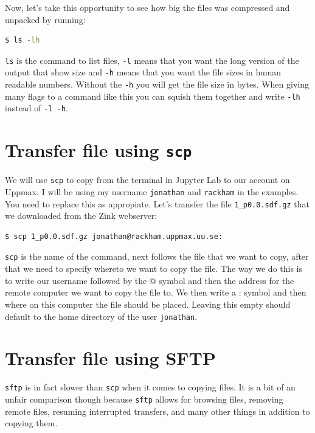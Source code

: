 \documentclass[watermark]{pbpreprint}
\begin{document}
\vspace{1\baselineskip}
Now, let's take this opportunity to see how big the files was compressed and
unpacked by running: 
\begin{lstlisting}[language=bash]
$ ls -lh
\end{lstlisting}
\texttt{ls} is the command to list files, \texttt{-l} means that you want the
long version of the output that show size and \texttt{-h} means that you want
the file sizes in human readable numbers. Without the \texttt{-h} you will get
the file size in bytes. When giving many flags to a command like this you can
squish them together and write \texttt{-lh} instead of \texttt{-l -h}.

\section{Transfer file using \texttt{scp}}
 We will use \texttt{scp} to copy from the terminal
in Jupyter Lab to our account on Uppmax. I will be using my username
\texttt{jonathan} and \texttt{rackham} in the examples. You need to replace
this as appropiate. Let's transfer the file \texttt{1\_p0.0.sdf.gz} that we
downloaded from the Zink webserver:
%
\begin{lstlisting}[language=bash,escapechar={|}]
$ scp 1_p0.0.sdf.gz jonathan@rackham.uppmax.uu.se:
\end{lstlisting}
\texttt{scp} is the name of the command, next follows the file that we want to
copy, after that we need to specify whereto we want to copy the file. The way
we do this is to write our username followed by the @ symbol and then the
address for the remote computer we want to copy the file to. We then write a :
symbol and then where on this computer the file should be placed. Leaving this
empty should default to the home directory of the user \texttt{jonathan}.

\section{Transfer file using SFTP}
\texttt{sftp} is in fact slower than \texttt{scp} when it comes to copying
files. It is a bit of an unfair comparison though because \texttt{sftp} allows
for browsing files, removing remote files, resuming interrupted transfers, and
many other things in addition to copying them.
\end{document}
